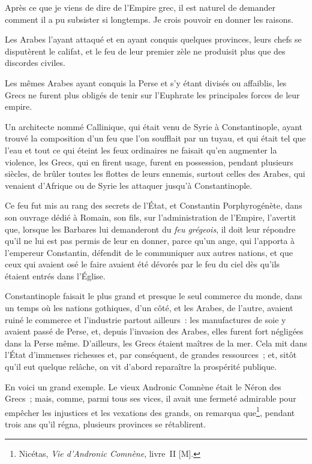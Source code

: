\documentclass[french,twoside]{book} %
\newcommand\chaptercont{} %
\begin{document}
\chaptercont
\noindent Après ce que je viens de dire de l’Empire grec, il est naturel de demander comment il a pu subsister si longtemps. Je crois pouvoir en donner les raisons.\par
Les Arabes l’ayant attaqué et en ayant conquis quelques provinces, leurs chefs se disputèrent le califat, et le feu de leur premier zèle ne produisit plus que des discordes civiles.\par
Les mêmes Arabes ayant conquis la Perse et s’y étant divisés ou affaiblis, les Grecs ne furent plus obligés de tenir sur l’Euphrate les principales forces de leur empire.\par
Un architecte nommé Callinique, qui était venu de Syrie à Constantinople, ayant trouvé la composition d’un feu que l’on soufflait par un tuyau, et qui était tel que l’eau et tout ce qui éteint les feux ordinaires ne faisait qu’en augmenter la violence, les Grecs, qui en firent usage, furent en possession, pendant plusieurs siècles, de brûler toutes les flottes de leurs ennemis, surtout celles des Arabes, qui venaient d’Afrique ou de Syrie les attaquer jusqu’à Constantinople.\par
Ce feu fut mis au rang des secrets de l’État, et Constantin Porphyrogénète, dans son ouvrage dédié à Romain, son fils, sur l’administration de l’Empire, l’avertit que, lorsque les Barbares lui demanderont du {\itshape feu grégeois}, il doit leur répondre qu’il ne lui est pas permis de leur en donner, parce qu’un ange, qui l’apporta à l’empereur Constantin, défendit de le communiquer aux autres nations, et que ceux qui avaient osé le faire avaient été dévorés par le feu du ciel dès qu’ils étaient entrés dans l’Église.\par
Constantinople faisait le plus grand et presque le seul commerce du monde, dans un temps où les nations gothiques, d’un côté, et les Arabes, de l’autre, avaient ruiné le commerce et l’industrie partout ailleurs : les manufactures de soie y avaient passé de Perse, et, depuis l’invasion des Arabes, elles furent fort négligées dans la Perse même. D’ailleurs, les Grecs étaient maîtres de la mer. Cela mit dans l’État d’immenses richesses et, par conséquent, de grandes ressources ; et, sitôt qu’il eut quelque relâche, on vit d’abord reparaître la prospérité publique.\par
En voici un grand exemple. Le vieux Andronic Comnène était le Néron des Grecs ; mais, comme, parmi tous ses vices, il avait une fermeté admirable pour empêcher les injustices et les vexations des grands, on remarqua que\footnote{Nicétas, {\itshape Vie d’Andronic Comnène}, livre II [M].}, pendant trois ans qu’il régna, plusieurs provinces se rétablirent.\par
\end{document}
